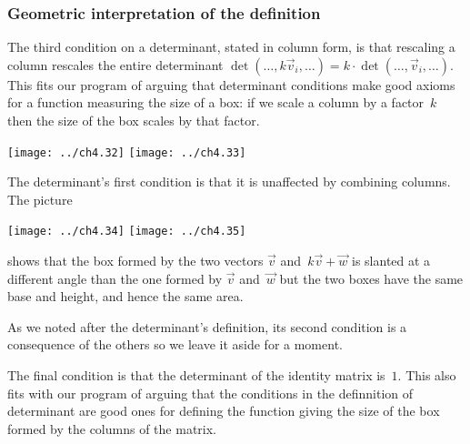 \documentclass[10pt,t]{beamer}
\begin{document}
\begin{frame}\vspace*{-1ex}
  \frametitle{Geometric interpretation of the definition}
The third condition on a determinant, stated in column form, is 
that rescaling a column rescales the entire determinant
$\det(\ldots,k\vec{v}_i,\ldots)=k\cdot\det(\ldots,\vec{v}_i,\ldots)$.
This fits our program of arguing that determinant conditions make
good axioms for a function measuring the size of a box:
if we scale a column by a factor~$k$ then the size of the box
scales by that factor. 
\begin{center}
  \texttt{[image: ../ch4.32]}
  \qquad
  \texttt{[image: ../ch4.33]}
\end{center}

\pause
The determinant's first condition is that it is unaffected by 
combining columns.
The picture 
\begin{center}
  \texttt{[image: ../ch4.34]}
  \quad
  \texttt{[image: ../ch4.35]}
\end{center}   
shows that the box
formed by the two vectors $\vec{v}$ and~$k\vec{v}+\vec{w}$ 
is slanted at a different angle than the one formed
by $\vec{v}$ and~$\vec{w}$ but the two boxes have
the same base and height, and hence the same area.
\end{frame}
\begin{frame}
As we noted after the determinant's definition, 
its second condition is a consequence of the 
others so we leave it aside for a moment.  

The final condition is that the determinant of the identity matrix is~$1$.
This also fits 
with our program of arguing that the conditions in the 
definnition of determinant are good ones for defining the function
giving the size of the box formed by the columns of the matrix.
\end{frame}
\end{document}

